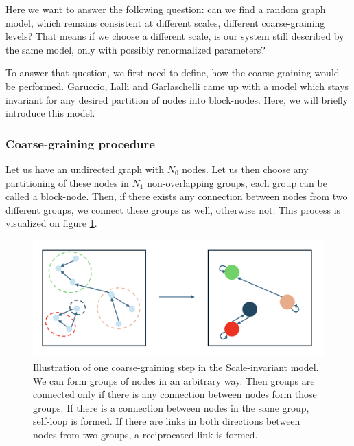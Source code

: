 Here we want to answer the following question: can we find a random graph model, which remains consistent at different scales, different coarse-graining levels? That means if we choose a different scale, is our system still described by the same model, only with possibly renormalized parameters?

To answer that question, we first need to define, how the coarse-graining would be performed. Garuccio, Lalli and Garlaschelli \cite{Garuccio2023} came up with a model which stays invariant for any desired partition of nodes into block-nodes. Here, we will briefly introduce this model.

\subsubsection{Coarse-graining procedure}
Let us have an undirected graph with $N_0$ nodes. Let us then choose any partitioning of these nodes in $N_1$ non-overlapping groups, each group can be called a block-node. Then, if there exists any connection between nodes from two different groups, we connect these groups as well, otherwise not. This process is visualized on figure \ref*{fig:coarse_graining}.

\begin{figure}[!ht]
    \centering
    \includegraphics[scale=0.45]{../img/theory/coarse_graining.png}
        \caption{Illustration of one coarse-graining step in the Scale-invariant model. We can form groups of nodes in an arbitrary way. Then groups are connected only if there is any connection between nodes form those groups. If there is a connection between nodes in the same group, self-loop is formed. If there are links in both directions between nodes from two groups, a reciprocated link is formed.}
        \label{fig:coarse_graining}
    \end{figure}

